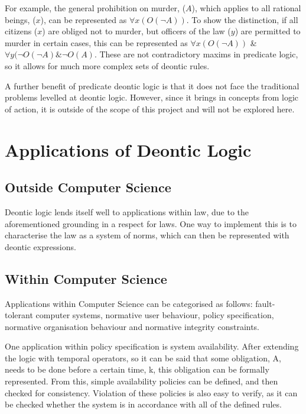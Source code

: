 \documentclass{l4proj}
\begin{document}
For example, the general prohibition on murder, ($A$), which applies to all rational beings, ($x$), can be represented as \( \forall{x(O( \neg A))} \). To show the distinction, if all citizens ($x$) are obliged not to murder, but officers of the law ($y$) are permitted to murder in certain cases, this can be represented as \( \forall{x(O( \neg A))} \) \& \( \forall{y( \neg O( \neg A) \& \neg O(A)} \). These are not contradictory maxims in predicate logic, so it allows for much more complex sets of deontic rules. 

A further benefit of predicate deontic logic is that it does not face the traditional problems levelled at deontic logic\cite{predicate}. However, since it brings in concepts from logic of action, it is outside of the scope of this project and will not be explored here. 

\section{Applications of Deontic Logic}
\subsection{Outside Computer Science}
Deontic logic lends itself well to applications within law, due to the aforementioned grounding in a respect for laws. One way to implement this is to characterise the law as a system of norms\cite{law-jonessergot}, which can then be represented with deontic expressions. 

\subsection{Within Computer Science}
Applications within Computer Science can be categorised as follows\cite{meyer93applications}: fault-tolerant computer systems, normative user behaviour, policy specification, normative organisation behaviour and normative integrity constraints. %

One application within policy specification is system availability\cite{brunel04deontic}. After extending the logic with temporal operators, so it can be said that some obligation, A, needs to be done before a certain time, k, this obligation can be formally represented. From this, simple availability policies can be defined, and then checked for consistency. Violation of these policies is also easy to verify, as it can be checked whether the system is in accordance with all of the defined rules. %
\end{document}
